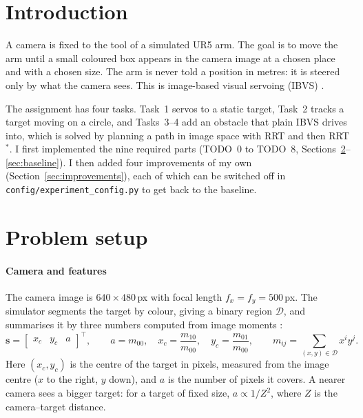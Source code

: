 \documentclass[11pt,a4paper]{article}
\newcommand{\vect}[1]{\bm{#1}}
\begin{document}
\section{Introduction}

A camera is fixed to the tool of a simulated UR5 arm. The goal is to move the arm until a small
coloured box appears in the camera image at a chosen place and with a chosen size. The arm is never
told a position in metres: it is steered only by what the camera sees. This is image-based visual
servoing (IBVS) \cite{chaumette2006}.

The assignment has four tasks. Task~1 servos to a static target, Task~2 tracks a target moving on a
circle, and Tasks~3--4 add an obstacle that plain IBVS drives into, which is solved by planning a path
in image space with RRT and then RRT$^{*}$. I first implemented the nine required parts (TODO~0 to
TODO~8, Sections~\ref{sec:setup}--\ref{sec:baseline}). I then added four improvements of my own
(Section~\ref{sec:improvements}), each of which can be switched off in
\texttt{config/experiment\_config.py} to get back to the baseline.

\section{Problem setup}\label{sec:setup}

\paragraph{Camera and features} The camera image is $640\times480$\,px with focal length
$f_x=f_y=500$\,px. The simulator segments the target by colour, giving a binary region $\mathcal{D}$,
and summarises it by three numbers computed from image moments \cite{chaumette2004}:
\begin{equation}
  \vect{s}=\begin{bmatrix}x_c & y_c & a\end{bmatrix}^{\!\top},\qquad
  a=m_{00},\quad x_c=\frac{m_{10}}{m_{00}},\quad y_c=\frac{m_{01}}{m_{00}},\qquad
  m_{ij}=\sum_{(x,y)\in\mathcal{D}} x^{i}y^{j}.
\end{equation}
Here $(x_c,y_c)$ is the centre of the target in pixels, measured from the image centre ($x$ to the
right, $y$ down), and $a$ is the number of pixels it covers. A nearer camera sees a bigger target:
for a target of fixed size, $a\propto 1/Z^{2}$, where $Z$ is the camera--target distance.
\end{document}
